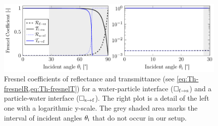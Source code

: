 \begin{figure}[tbp]
  \centering
  \includegraphics[]{Plots/cache/Fresnel.pdf}
  \caption{Fresnel coefficients of reflectance and transmittance (see 
  \cref{eq:Th-fresnelR,eq:Th-fresnelT}) for a water-particle interface 
  ($\Box_{\mathrm{f}\rightarrow\mathrm{s}}$) and a particle-water interface 
($\Box_{\mathrm{s}\rightarrow\mathrm{f}}$). The right plot is a detail of the left one 
with a logarithmic y-scale. The grey shaded area marks the interval of incident 
angles $\theta_{\mathrm{i}}$ that do not occur in our setup.}
  \label{fig:Th-fresnel}
\end{figure}

